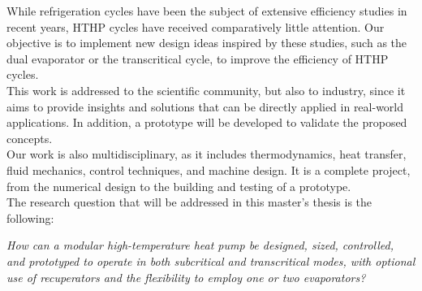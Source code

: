 While refrigeration cycles have been the subject of extensive efficiency studies in recent years, 
HTHP cycles have received comparatively little attention. Our objective is to implement new design 
ideas inspired by these studies, such as the dual evaporator or the transcritical cycle, to 
improve the efficiency of HTHP cycles. \\

This work is addressed to the scientific community, but also to industry, 
since it aims to provide insights and solutions that can be directly applied in real-world 
applications. In addition, a prototype will be developed to validate the proposed concepts. \\

Our work is also multidisciplinary, as it includes thermodynamics, heat transfer, fluid mechanics,
 control techniques, and machine design. It is a complete project, from the numerical design to 
 the building and testing of a prototype. \\

The research question that will be addressed in this master's thesis is the following:



\begin{center}
    \textit{How can a modular high-temperature heat pump be designed, 
    sized, controlled, and prototyped to operate in both subcritical and transcritical modes, 
    with optional use of recuperators and the flexibility to employ one or two evaporators?}
\end{center}